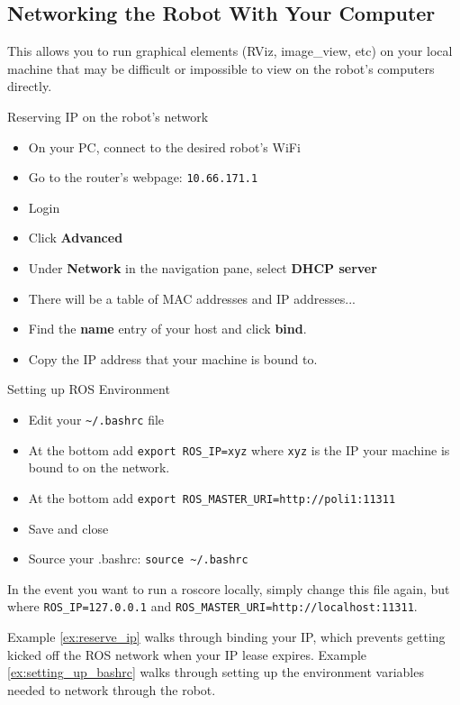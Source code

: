 \subsection{Networking the Robot With Your Computer}
This allows you to run graphical elements (RViz, image\_view, etc) on your local machine that may be difficult or impossible to view on the robot's computers directly. \\

\begin{example}{Reserving IP on the robot's network} \label{ex:reserve_ip}
\begin{itemize}
  \item On your PC, connect to the desired robot's WiFi
  \item Go to the router's webpage: \texttt{10.66.171.1}
  \item Login
  \item Click \textbf{Advanced}
  \item Under \textbf{Network} in the navigation pane, select \textbf{DHCP server}
  \item There will be a table of MAC addresses and IP addresses...
  \item Find the \textbf{name} entry of your host and click \textbf{bind}.
  \item Copy the IP address that your machine is bound to.
\end{itemize}
\end{example}

\begin{example}{Setting up ROS Environment}\label{ex:setting_up_bashrc}
\begin{itemize}
  \item Edit your \texttt{\textasciitilde/.bashrc} file
  \item At the bottom add \texttt{export ROS\_IP=xyz} where \texttt{xyz} is the IP your machine is bound to on the network.
  \item At the bottom add \texttt{export ROS\_MASTER\_URI=http://poli1:11311}
  \item Save and close
  \item Source your .bashrc: \texttt{source \textasciitilde/.bashrc}
\end{itemize}
  In the event you want to run a roscore locally, simply change this file again, but where \texttt{ROS\_IP=127.0.0.1} and \texttt{ROS\_MASTER\_URI=http://localhost:11311}.
\end{example}

Example \ref{ex:reserve_ip} walks through binding your IP, which prevents getting kicked off the ROS network when your IP lease expires. 
Example \ref{ex:setting_up_bashrc} walks through setting up the environment variables needed to network through the robot. \\

